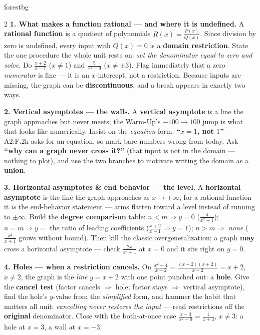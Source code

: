 \documentclass[10pt]{article}
\begin{document}
\begin{skillbox}[Lesson]{forestbg}
\begin{multicols}{2}
\textbf{1. What makes a function rational --- and where it is undefined.} A \textbf{rational
function} is a quotient of polynomials $R(x)=\frac{P(x)}{Q(x)}$. Since division by zero is undefined,
every input with $Q(x)=0$ is a \textbf{domain restriction}. State the one procedure the whole unit
rests on: \emph{set the denominator equal to zero and solve}. Do $\frac{x+2}{x-1}$ ($x\neq1$) and
$\frac{5}{x^2-9}$ ($x\neq\pm3$). Flag immediately that a zero \emph{numerator} is fine --- it is an
$x$-intercept, not a restriction. Because inputs are missing, the graph can be
\textbf{discontinuous}, and a break appears in exactly two ways.

\textbf{2. Vertical asymptotes --- the walls.} A \textbf{vertical asymptote} is a line the graph
approaches but never meets; the Warm-Up's $-100 \to 100$ jump is what that looks like numerically.
Insist on the \emph{equation} form: \textbf{``$x=1$, not $1$''} --- A2.F.2h asks for an equation, so
mark bare numbers wrong from today. Ask \textbf{``why can a graph never cross it?''} (that input is
not in the domain --- nothing to plot), and use the two branches to motivate writing the domain as a
\textbf{union}.

\columnbreak

\textbf{3. Horizontal asymptotes \& end behavior --- the level.} A \textbf{horizontal asymptote} is
the line the graph approaches as $x\to\pm\infty$; for a rational function it \emph{is} the
end-behavior statement --- arms flatten toward a level instead of running to $\pm\infty$. Build the
\textbf{degree comparison} table: $n<m\Rightarrow y=0$ ($\frac{4}{x^2+1}$); $n=m\Rightarrow y=$ the
ratio of leading coefficients ($\frac{x+2}{x-1}\Rightarrow y=1$); $n>m\Rightarrow$ \emph{none}
($\frac{x^2}{x+1}$ grows without bound). Then kill the classic overgeneralization: a graph
\textbf{may} cross a horizontal asymptote --- check $\frac{2x}{x^2+1}$ at $x=0$ and it sits right on
$y=0$.

\textbf{4. Holes --- when a restriction cancels.} On $\frac{x^2-4}{x-2}=\frac{(x-2)(x+2)}{x-2}=x+2$,
$x\neq2$, the graph is the \emph{line} $y=x+2$ with one point punched out: a \textbf{hole}. Give the
\textbf{cancel test} (factor cancels $\Rightarrow$ hole; factor stays $\Rightarrow$ vertical
asymptote), find the hole's $y$-value from the \emph{simplified} form, and hammer the habit that
matters all unit: \emph{cancelling never restores the input} --- read restrictions off the
\textbf{original} denominator. Close with the both-at-once case
$\frac{x-3}{x^2-9}=\frac{1}{x+3}$, $x\neq3$: a hole at $x=3$, a wall at $x=-3$.


\end{multicols}
\end{skillbox}
\end{document}

